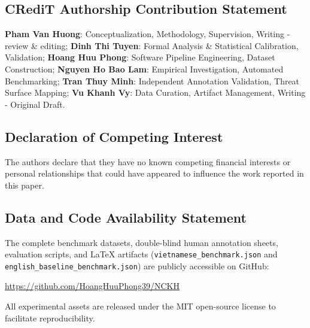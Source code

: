
\subsection*{CRediT Authorship Contribution Statement}
\textbf{Pham Van Huong}: Conceptualization, Methodology, Supervision, Writing - review \& editing;
\textbf{Dinh Thi Tuyen}: Formal Analysis \& Statistical Calibration, Validation;
\textbf{Hoang Huu Phong}: Software Pipeline Engineering, Dataset Construction;
\textbf{Nguyen Ho Bao Lam}: Empirical Investigation, Automated Benchmarking;
\textbf{Tran Thuy Minh}: Independent Annotation Validation, Threat Surface Mapping;
\textbf{Vu Khanh Vy}: Data Curation, Artifact Management, Writing - Original Draft.

\subsection*{Declaration of Competing Interest}
The authors declare that they have no known competing financial interests or personal relationships that could have appeared to influence the work reported in this paper.

\subsection*{Data and Code Availability Statement}
The complete benchmark datasets, double-blind human annotation sheets, evaluation scripts, and \LaTeX{} artifacts (\texttt{vietnamese\_benchmark.json} and \texttt{english\_baseline\_benchmark.json}) are publicly accessible on GitHub:
\begin{center}
\url{https://github.com/HoangHuuPhong39/NCKH}
\end{center}
All experimental assets are released under the MIT open-source license to facilitate reproducibility.
